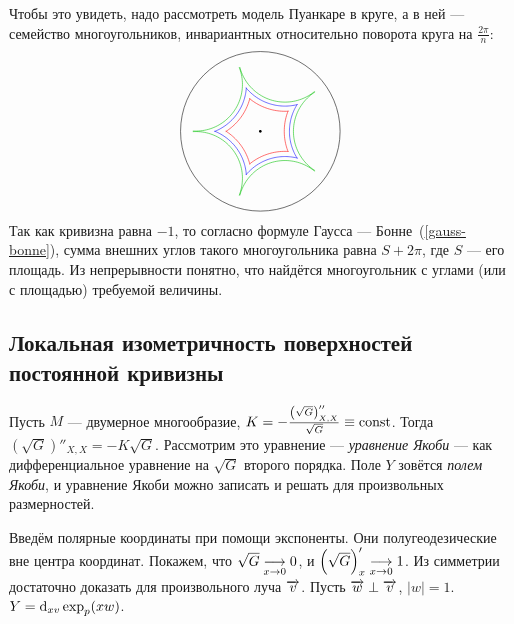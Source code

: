 \documentclass[a4paper]{report}
\begin{document}
{{{            Чтобы это увидеть, надо рассмотреть модель Пуанкаре в круге, а в ней --- семейство многоугольников, инвариантных относительно поворота круга на $\frac{2\pi}{n}$:
            \[\begin{tikzpicture}
                  \draw (0, 0) circle (2);
                  \fill (0, 0) circle (1pt);
                  \pgfmathsetmacro{\r}{1.4} %
                  \foreach \i in {0,1,...,4} {
                      \draw[red,smooth,domain={(2.2+\i)*72}:{(2.8+\i)*72}] plot ({\r*cos(\x)+2*cos(72*\i)}, {\r*sin(\x)+2*sin(72*\i)});
                  }
                  \pgfmathsetmacro{\r}{1.27} %
                  \foreach \i in {0,1,...,4} {
                    \draw[blue,smooth,domain={(2.05+\i)*72}:{(2.95+\i)*72}] plot ({\r*cos(\x)+2*cos(72*\i)}, {\r*sin(\x)+2*sin(72*\i)});
                  }
                  \pgfmathsetmacro{\r}{1.17} %
                  \foreach \i in {0,1,...,4} {
                    \draw[darkgreen,smooth,domain={(1.7+\i)*72}:{(3.3+\i)*72}] plot ({\r*cos(\x)+2*cos(72*\i)}, {\r*sin(\x)+2*sin(72*\i)});
                  }
            \end{tikzpicture}\]
            Так как кривизна равна $-1$, то согласно формуле Гаусса --- Бонне~(\cref{gauss-bonne}), сумма внешних углов такого многоугольника равна $S+2\pi$, где $S$ --- его площадь.
            Из непрерывности понятно, что найдётся многоугольник с углами (или с площадью) требуемой величины.\qedhere
            }
        }
    }
    \subsection{Локальная изометричность поверхностей постоянной кривизны}
    Пусть $M$ --- двумерное многообразие, $K = -\frac{\left(\sqrt{G}\right)''_{X,X}}{\sqrt{G}} \equiv \operatorname{const}$.
    Тогда $\left(\sqrt{G}\right)''_{X,X} = -K \sqrt{G}$.
    Рассмотрим это уравнение --- \emph{уравнение Якоби} --- как дифференциальное уравнение на $\sqrt{G}$ второго порядка.
    Поле $Y$ зовётся \emph{полем Якоби}, и уравнение Якоби можно записать и решать для произвольных размерностей.

    Введём полярные координаты при помощи экспоненты.
    Они полугеодезические вне центра координат.
    Покажем, что $\sqrt{G} \underset{x \to 0}{\longrightarrow} 0$, и $\left(\sqrt{G}\right)'_{x} \underset{x \to 0}{\longrightarrow} 1$.
    Из симметрии достаточно доказать для произвольного луча $\overrightarrow{v}$.
    Пусть $\overrightarrow{w} \perp \overrightarrow{v}$, $|w| = 1$.
    $Y = \operatorname{d}\!_{xv} \exp_{p}(xw)$.
\end{document}
